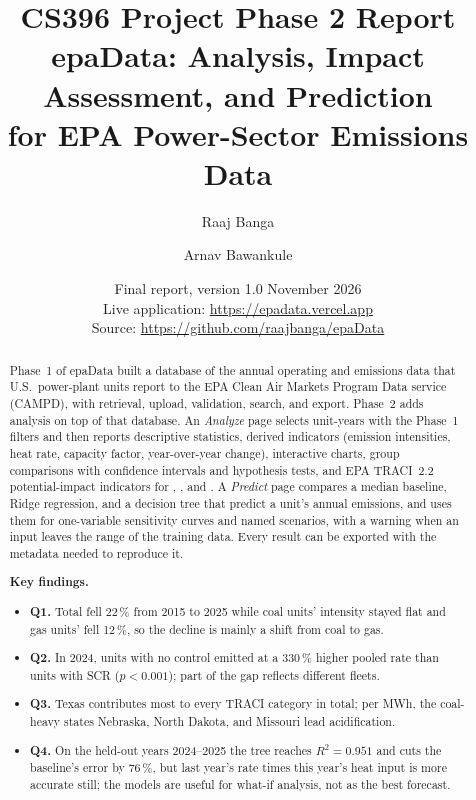 \documentclass[11pt,a4paper]{article}
\title{%
  \vspace*{-1em}
  {\Large CS396 Project Phase 2 Report}\\[0.8em]
  \textbf{epaData}: Analysis, Impact Assessment, and Prediction\\for EPA Power-Sector Emissions Data}
\author{Raaj Banga \and Arnav Bawankule}
\date{Final report, version 1.0 \textperiodcentered{} November 2026\\[0.4em]
  \small Live application: \url{https://epadata.vercel.app}\\
  Source: \url{https://github.com/raajbanga/epaData}}
\begin{document}
\maketitle

\begin{abstract}
\noindent
Phase~1 of epaData built a database of the annual operating and emissions data that U.S.\
power-plant units report to the EPA Clean Air Markets Program Data service (CAMPD), with
retrieval, upload, validation, search, and export. Phase~2 adds analysis on top of that
database. An \emph{Analyze} page selects unit-years with the Phase~1 filters and then reports
descriptive statistics, derived indicators (emission intensities, heat rate, capacity factor,
year-over-year change), interactive charts, group comparisons with confidence intervals and
hypothesis tests, and EPA TRACI~2.2 potential-impact indicators for \COtwo{}, \SOtwo{}, and
\NOx{}. A \emph{Predict} page compares a median baseline, Ridge regression, and a decision tree that
predict a unit's annual \NOx{} emissions, and uses them for one-variable sensitivity curves and
named scenarios, with a warning when an input leaves the range of the training data. Every
result can be exported with the metadata needed to reproduce it.

\medskip\noindent\textbf{Key findings.}
\begin{itemize}[leftmargin=1.2em, itemsep=1pt, topsep=2pt]
  \item \textbf{Q1.} Total \COtwo{} fell 22\,\% from 2015 to 2025 while coal units' intensity
        stayed flat and gas units' fell 12\,\%, so the decline is mainly a shift from coal to gas.
  \item \textbf{Q2.} In 2024, units with no \NOx{} control emitted at a 330\,\% higher pooled
        rate than units with SCR ($p < 0.001$); part of the gap reflects different fleets.
  \item \textbf{Q3.} Texas contributes most to every TRACI category in total; per MWh, the
        coal-heavy states Nebraska, North Dakota, and Missouri lead acidification.
  \item \textbf{Q4.} On the held-out years 2024--2025 the tree reaches $R^2 = 0.951$ and cuts
        the baseline's error by 76\,\%, but last year's \NOx{} rate times this year's heat input
        is more accurate still; the models are useful for what-if analysis, not as the best
        forecast.
\end{itemize}
\end{abstract}
\end{document}
